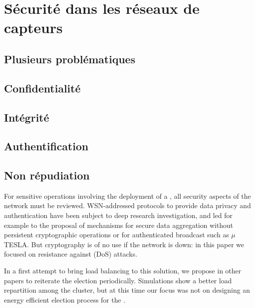 \section{Sécurité dans les réseaux de capteurs}

\subsection{Plusieurs problématiques}

\subsection{Confidentialité}

\subsection{Intégrité}

\subsection{Authentification}

\subsection{Non répudiation}






For sensitive operations involving the deployment of a \wsn, all security aspects of the network must be reviewed.
WSN-addressed protocols to provide data privacy\cite{OX09} and authentication\cite{SOBMCN11} have been subject to deep research investigation, and led for example to the proposal of mechanisms for secure data aggregation without persistent cryptographic operations\cite{WDSX07} or for authenticated broadcast such as $\mu$TESLA\cite{PSWCT02}.
But cryptography is of no use if the network is down: in this paper we focused on resistance against \dos (DoS) attacks.

In a first attempt to bring load balancing to this solution, we propose in other papers\cite{GMT12,BMM13} to reiterate the election periodically.
Simulations show a better load repartition among the cluster, but at this time our focus was not on designing an energy efficient election process for the \cns.




